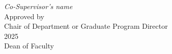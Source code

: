 \hspace*{1.5cm} \textit{Co-Supervisor's name} \\[1.3em]
\vfill
\noindent Approved by \raisebox{-0.9em}{\rlap{\it }}\hrulefill \\
\hspace*{3.5cm} Chair of Department or Graduate Program Director \\[1.3em]
\noindent \makebox[3cm]{\hrulefill} 2025 \hspace*{3cm} \hrulefill \\
\hspace*{8.5cm} Dean of Faculty \\




